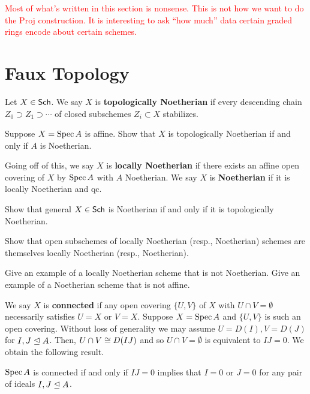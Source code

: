 \documentclass[11pt]{article}
\begin{document}
\textcolor{red}{Most of what's written in this section is nonsense. This is not how we want to do the Proj construction. It is interesting to ask ``how much'' data certain graded rings encode about certain schemes.}

\section{Faux Topology}
Let $X\in\operatorname{\mathsf{Sch}}$. We say $X$ is \textbf{topologically Noetherian} if every descending chain $Z_0\supset Z_1\supset\cdots$ of closed subschemes $Z_i\subset X$ stabilizes.

\begin{exercise}
Suppose $X=\operatorname{Spec} A$ is affine. Show that $X$ is topologically Noetherian if and only if $A$ is Noetherian.
\end{exercise}

Going off of this, we say $X$ is \textbf{locally Noetherian} if there exists an affine open covering of $X$ by $\operatorname{Spec} A$ with $A$ Noetherian. We say $X$ is \textbf{Noetherian} if it is locally Noetherian and qc.

\begin{exercise}
Show that general $X\in\operatorname{\mathsf{Sch}}$ is Noetherian if and only if it is topologically Noetherian.
\end{exercise}

\begin{exercise}
Show that open subschemes of locally Noetherian (resp., Noetherian) schemes are themselves locally Noetherian (resp., Noetherian).
\end{exercise}

\begin{exercise}
Give an example of a locally Noetherian scheme that is not Noetherian. Give an example of a Noetherian scheme that is not affine.
\end{exercise}

We say $X$ is \textbf{connected} if any open covering $\{U,V\}$ of $X$ with $U\cap V=\emptyset$ necessarily satisfies $U=X$ or $V=X$. Suppose $X=\operatorname{Spec} A$ and $\{U,V\}$ is such an open covering. Without loss of generality we may assume $U=D(I),V=D(J)$ for $I,J\trianglelefteq A$. Then, $U\cap V\cong D(IJ)$ and so $U\cap V=\emptyset$ is equivalent to $IJ=0$. We obtain the following result.

\begin{proposition}
$\operatorname{Spec} A$ is connected if and only if $IJ=0$ implies that $I=0$ or $J=0$ for any pair of ideals $I,J\trianglelefteq A$.
\end{proposition}
\end{document}
